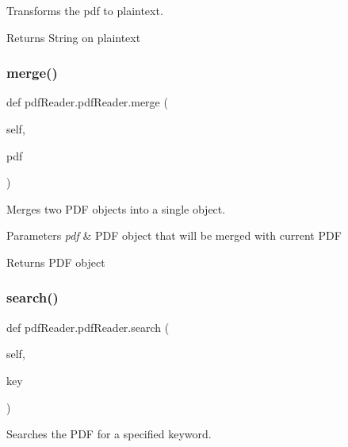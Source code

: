 Transforms the pdf to plaintext. 

\begin{DoxyReturn}{Returns}
String on plaintext 
\end{DoxyReturn}
\mbox{\label{classpdfReader_1_1pdfReader_af1b3ff3aa7d88847a9faa825d0917384}} 
\subsubsection{\texorpdfstring{merge()}{merge()}}
{\footnotesize\ttfamily def pdf\+Reader.\+pdf\+Reader.\+merge (\begin{DoxyParamCaption}\item[{}]{self,  }\item[{}]{pdf }\end{DoxyParamCaption})}



Merges two P\+DF objects into a single object. 


\begin{DoxyParams}{Parameters}
{\em pdf} & P\+DF object that will be merged with current P\+DF \\
\hline
\end{DoxyParams}
\begin{DoxyReturn}{Returns}
P\+DF object 
\end{DoxyReturn}
\mbox{\label{classpdfReader_1_1pdfReader_abe6cdb3300ed8e8d541eeb181e6d2442}} 
\subsubsection{\texorpdfstring{search()}{search()}}
{\footnotesize\ttfamily def pdf\+Reader.\+pdf\+Reader.\+search (\begin{DoxyParamCaption}\item[{}]{self,  }\item[{}]{key }\end{DoxyParamCaption})}



Searches the P\+DF for a specified keyword. 


